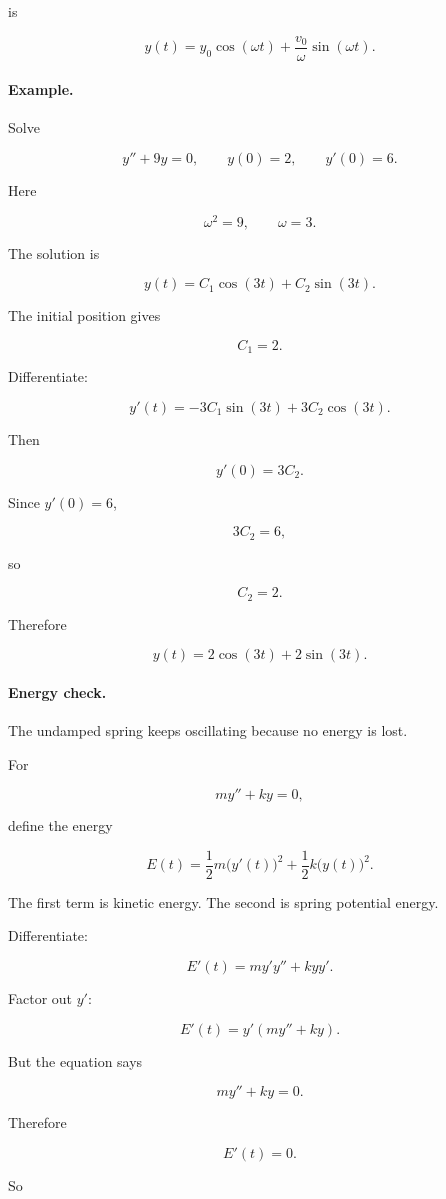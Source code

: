 is

\[
\boxed{
y(t)=y_0\cos(\omega t)+\frac{v_0}{\omega}\sin(\omega t).
}
\]

\paragraph{Example.}
Solve

\[
y''+9y=0,
\qquad
y(0)=2,
\qquad
y'(0)=6.
\]

Here

\[
\omega^2=9,
\qquad
\omega=3.
\]

The solution is

\[
y(t)=C_1\cos(3t)+C_2\sin(3t).
\]

The initial position gives

\[
C_1=2.
\]

Differentiate:

\[
y'(t)=-3C_1\sin(3t)+3C_2\cos(3t).
\]

Then

\[
y'(0)=3C_2.
\]

Since \(y'(0)=6\),

\[
3C_2=6,
\]

so

\[
C_2=2.
\]

Therefore

\[
\boxed{
y(t)=2\cos(3t)+2\sin(3t).
}
\]

\paragraph{Energy check.}
The undamped spring keeps oscillating because no energy is lost.

For

\[
my''+ky=0,
\]

define the energy

\[
E(t)=\frac12m\bigl(y'(t)\bigr)^2+\frac12k\bigl(y(t)\bigr)^2.
\]

The first term is kinetic energy.  The second is spring potential energy.

Differentiate:

\[
E'(t)
=
m y'y''+k yy'.
\]

Factor out \(y'\):

\[
E'(t)=y'(my''+ky).
\]

But the equation says

\[
my''+ky=0.
\]

Therefore

\[
E'(t)=0.
\]

So


